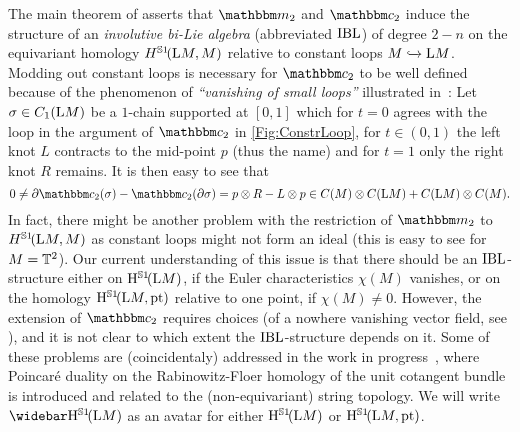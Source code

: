 \documentclass[\MainFolder/Text.tex]{subfiles}
\begin{document}
The main theorem of \cite{Chas2004} asserts that $\StringOp_2$ and $\StringCoOp_2$ induce the structure of an \emph{involutive bi-Lie algebra} (abbreviated $\mathrm{IBL}$) of degree $2-n$ on the equivariant homology $H^{\mathbb{S}{1}}\!(\mathrm{L} M,M)$ relative to constant loops $M\xhookrightarrow{}\mathrm{L} M$. Modding out constant loops is necessary for $\StringCoOp_2$ to be well defined because of the phenomenon of \emph{``vanishing of small loops''} illustrated in~\cite{Cieliebak2007}:  Let $\sigma\in C_1(\mathrm{L} M)$ be a $1$-chain supported at $[0,1]$ which for $t=0$ agrees with the loop in the argument of $\StringCoOp_2$ in \ref{Fig:ConstrLoop}, for $t\in (0,1)$ the left knot $L$ contracts to the mid-point $p$ (thus the name) and for $t=1$ only the right knot $R$ remains. It is then easy to see that 
$$ 0 \neq \Bdd \StringCoOp_2(\sigma) - \StringCoOp_2(\Bdd \sigma) = p\otimes R - L \otimes p \in C(M)\otimes C(\Loop M) + C(\Loop M)\otimes C(M). $$
In fact, there might be another problem with the restriction of $\StringOp_2$ to $H^{\mathbb{S}{1}}\!(\mathrm{L} M,M)$ as constant loops might not form an ideal (this is easy to see for $M=\mathbb{T}^2$). Our current understanding of this issue is that there should be an $\mathrm{IBL}$-structure either on $\mathrm{H}^{\mathbb{S}{1}}\!(\mathrm{L} M)$, if the Euler characteristics $\chi(M)$ vanishes, or on the homology $\mathrm{H}^{\mathbb{S}{1}}\!(\mathrm{L} M,\mathrm{pt})$ relative to one point, if $\chi(M) \neq 0$. However, the extension of $\StringCoOp_2$ requires choices (of a nowhere vanishing vector field, see \cite{Basu2011}), and it is not clear to which extent the $\mathrm{IBL}$-structure depends on it. Some of these problems are (coincidentaly) addressed in the work in progress~\cite{Cieliebak2018}, where Poincar\'e duality on the Rabinowitz-Floer homology of the unit cotangent bundle is introduced and related to the (non-equivariant) string topology. We will write $\RedEquivHom(\Loop M)$ as an avatar for either $\mathrm{H}^{\mathbb{S}{1}}\!(\mathrm{L} M)$ or $\mathrm{H}^{\mathbb{S}{1}}\!(\mathrm{L} M,\mathrm{pt})$.
\end{document}
